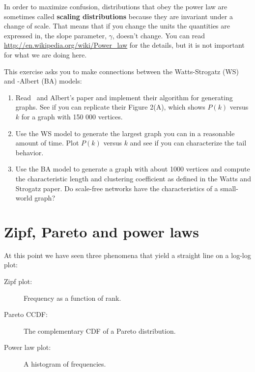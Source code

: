 \documentclass[10pt]{book}
\begin{document}
In order to maximize confusion, distributions that obey the power law
are sometimes called {\bf scaling distributions} because they are
invariant under a change of scale.  That means that if you change the
units the quantities are expressed in, the slope parameter, $\gamma$,
doesn't change.  You can read \url{http://en.wikipedia.org/wiki/Power_law} for
the details, but it is not important for what we are doing here.


\begin{exercise}

This exercise asks you to make connections between the Watts-Strogatz (WS)
and \Barabasi-Albert (BA) models:

\begin{enumerate}

\item Read \Barabasi~and Albert's paper and implement their algorithm
for generating graphs.  See if you can replicate their Figure 2(A),
which shows $P(k)$ versus $k$ for a graph with 150 000 vertices.

\item Use the WS model to generate the largest graph you can in
a reasonable amount of time.  Plot $P(k)$ versus $k$ and see if
you can characterize the tail behavior.

\item Use the BA model to generate a graph with about 1000 vertices
and compute the characteristic length and clustering coefficient
as defined in the Watts and Strogatz paper.  Do scale-free networks
have the characteristics of a small-world graph?

\end{enumerate}

\end{exercise}


\section{Zipf, Pareto and power laws}


At this point we have seen three phenomena that yield a straight line
on a log-log plot:

\begin{description}

\item[Zipf plot:] Frequency as a function of rank.

\item[Pareto CCDF:] The complementary CDF of a Pareto distribution.

\item[Power law plot:] A histogram of frequencies.

\end{description}
\end{document}
